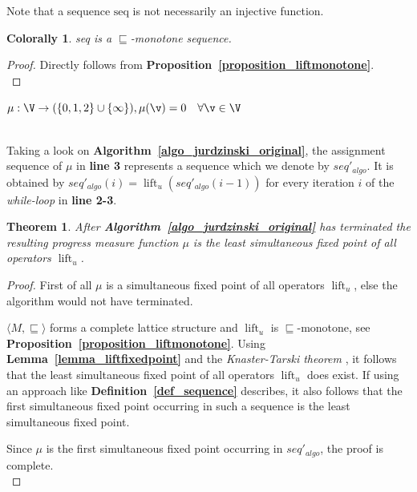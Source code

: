 \documentclass[12pt,oneside,bibliography=totoc,abstracton]{scrartcl}
\DeclareMathOperator{\lift}{lift}
\newcommand{\lemmaref}[1]{\textbf{Lemma~\ref{#1}}}
\newcommand{\propositionref}[1]{\textbf{Proposition~\ref{#1}}}
\newcommand{\algoref}[1]{\textbf{Algorithm~\ref{#1}}}
\newcommand{\defref}[1]{\textbf{Definition~\ref{#1}}}
\newcommand{\libref}[1]{\textbf{\cite{#1}}}
\newtheorem{mytheorem}{Theorem}
\newtheorem{mycorollary}{Colorally}
\begin{document}
Note that a sequence $\text{seq}$ is not necessarily an injective function.
\begin{mycorollary}\label{corollary_seqmonotone}
	\textnormal{seq} is a $\sqsubseteq$-monotone sequence.
\end{mycorollary}
\begin{proof}
	Directly follows from \propositionref{proposition_liftmonotone}.\\
\end{proof}
\IncMargin{1em}
\begin{algorithm}
$\mu: \V \to (\{0, 1, 2\} \cup \{\infty\}), \mu(\v) = 0 \quad \forall \v \in \V$\;
\BlankLine
\BlankLine
\While{$\exists \u \in \V : \pm \sqsubset \lift_{\u}(\pm)$}{
	$\pm := \lift_{\u}(\pm)$\;
}
\BlankLine
\caption{Original version of \textit{Jurdzi\'nskis algorithm} from \libref{jurdz_original}.}\label{algo_jurdzinski_original}
\end{algorithm}\DecMargin{1em}\quad\\
Taking a look on \algoref{algo_jurdzinski_original}, the assignment sequence of $\mu$ in \textbf{line 3}
represents a sequence which we denote by $seq'_{\textit{algo}}$. It is obtained by
$seq'_{\textit{algo}}(i) = \lift_u(seq'_{\textit{algo}}(i - 1))$ for every iteration $i$ of
the \textit{while-loop} in \textbf{line 2-3}.
\begin{mytheorem}\label{theorem_algooriginaltofixpoint}
	After \algoref{algo_jurdzinski_original} has terminated the resulting progress measure function
	$\mu$ is the \textnormal{least simultaneous fixed point} of all operators $\lift_u$.
\end{mytheorem}
\begin{proof}
	First of all $\mu$ is a simultaneous fixed point of all operators $\lift_u$,
	else the algorithm would not have terminated.
	
	$\langle M, \sqsubseteq \rangle$ forms a complete lattice structure and $\lift_u$
	is $\sqsubseteq$-monotone, see \propositionref{proposition_liftmonotone}.
	Using \lemmaref{lemma_liftfixedpoint} and the
	\textit{Knaster-Tarski theorem} \libref{knaster_tarski}, it follows that the
	least simultaneous fixed point of all operators $\lift_u$ does exist.
	If using an approach like \defref{def_sequence} describes,
	it also follows that the first simultaneous fixed point occurring in such a sequence
	is the least simultaneous fixed point.
	
	Since $\mu$ is the first simultaneous fixed point occurring in $seq'_{\textit{algo}}$,
	the proof is complete.\\
\end{proof}\quad\\
\end{document}
